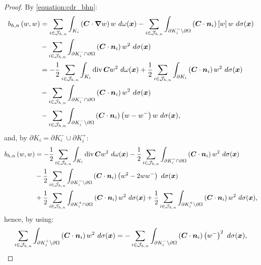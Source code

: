 \begin{proof}
    By \cref{equation:cdr_bhn}:
    \begin{align*}
        b_{h, n} \left( w, w \right) &= \sum_{i \in \mathcal{J}_{h, n}} \int_{K_i} \left( \bm{C} \cdot \bm{\nabla} w \right) w ~ d \omega(\bm{x}) - \sum_{i \in \mathcal{J}_{h, n}} \int_{\partial K_i^- \setminus \partial \Omega} \left( \bm{C} \cdot \bm{n}_i \right) \left[ w \right] w ~ d \sigma(\bm{x}) \\
        &- \sum_{i \in \mathcal{J}_{h, n}} \int_{\partial K_i^- \cap \partial \Omega} \left( \bm{C} \cdot \bm{n}_i \right) w^2 ~ d \sigma(\bm{x}) \\
        &= - \frac12 \sum_{i \in \mathcal{J}_{h, n}} \int_{K_i} \operatorname*{div}{\bm{C}} w^2 ~ d \omega(\bm{x}) + \frac12 \sum_{i \in \mathcal{J}_{h, n}} \int_{\partial K_i} \left( \bm{C} \cdot \bm{n}_i \right) w^2 ~ d \sigma(\bm{x}) \\
        &- \sum_{i \in \mathcal{J}_{h, n}} \int_{\partial K_i^- \cap \partial \Omega} \left( \bm{C} \cdot \bm{n}_i \right) w^2 ~ d \sigma(\bm{x}) \\
        &- \sum_{i \in \mathcal{J}_{h, n}} \int_{\partial K_i^- \setminus \partial \Omega} \left( \bm{C} \cdot \bm{n}_i \right) \left( w - w^- \right) w ~ d \sigma(\bm{x}),
    \end{align*}
    and, by $\partial K_i = \partial K_i^- \cup \partial K_i^+$:
    \begin{align*}
        b_{h, n} \left( w, w \right) &= - \frac12 \sum_{i \in \mathcal{J}_{h, n}} \int_{K_i} \operatorname*{div}{\bm{C}} w^2 ~ d \omega(\bm{x}) - \frac12 \sum_{i \in \mathcal{J}_{h, n}} \int_{\partial K_i^- \cap \partial \Omega} \left( \bm{C} \cdot \bm{n}_i \right) w^2 ~ d \sigma(\bm{x}) \\
        &- \frac12 \sum_{i \in \mathcal{J}_{h, n}} \int_{\partial K_i^- \setminus \partial \Omega} \left( \bm{C} \cdot \bm{n}_i \right) \left( w^2 - 2 ww^- \right) ~ d \sigma(\bm{x}) \\
        &+ \frac12 \sum_{i \in \mathcal{J}_{h, n}} \int_{\partial K_i^+ \cap \partial \Omega} \left( \bm{C} \cdot \bm{n}_i \right) w^2 ~ d \sigma(\bm{x}) + \frac12 \sum_{i \in \mathcal{J}_{h, n}} \int_{\partial K_i^+ \setminus \partial \Omega} \left( \bm{C} \cdot \bm{n}_i \right) w^2 ~ d \sigma(\bm{x}),
    \end{align*}
    hence, by using:
    \begin{align*}
        \sum_{i \in \SpaceTimeIndices} \int_{\partial K_i^+ \setminus \partial \Omega} \left( \Convection \cdot \Vektor{n}_i \right) w^2 ~ d \sigma(\Vektor{x}) = - \sum_{i \in \SpaceTimeIndices} \int_{\partial K_i^- \setminus \partial \Omega} \left( \Convection \cdot \Vektor{n}_i \right) \left( w^- \right)^2 ~ d \sigma(\Vektor{x}),

\end{align*}
\end{proof}
